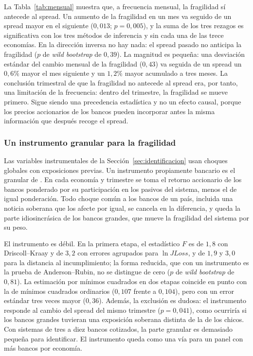La Tabla~\ref{tab:mensual} muestra que, a frecuencia mensual, la fragilidad sí antecede al spread. Un aumento de la fragilidad en un mes va seguido de un spread mayor en el siguiente ($0{,}013$; $p=0{,}005$), y la suma de los tres rezagos es significativa con los tres métodos de inferencia y sin cada una de las trece economías. En la dirección inversa no hay nada: el spread pasado no anticipa la fragilidad ($p$ de \textit{wild bootstrap} de $0{,}39$). La magnitud es pequeña: una desviación estándar del cambio mensual de la fragilidad ($0{,}43$) va seguida de un spread un $0{,}6\%$ mayor el mes siguiente y un $1{,}2\%$ mayor acumulado a tres meses. La conclusión trimestral de que la fragilidad no antecede al spread era, por tanto, una limitación de la frecuencia: dentro del trimestre, la fragilidad se mueve primero. Sigue siendo una precedencia estadística y no un efecto causal, porque los precios accionarios de los bancos pueden incorporar antes la misma información que después recoge el spread.

\subsubsection{Un instrumento granular para la fragilidad}
\label{sec:giv}

Las variables instrumentales de la Sección~\ref{sec:identificacion} usan choques globales con exposiciones previas. Un instrumento propiamente bancario es el granular de \citet{GabaixKoijen2024}. En cada economía y trimestre se toma el retorno accionario de los bancos ponderado por su participación en los pasivos del sistema, menos el de igual ponderación. Todo choque común a los bancos de un país, incluida una noticia soberana que los afecte por igual, se cancela en la diferencia, y queda la parte idiosincrásica de los bancos grandes, que mueve la fragilidad del sistema por su peso.

El instrumento es débil. En la primera etapa, el estadístico $F$ es de $1{,}8$ con Driscoll--Kraay y de $3{,}2$ con errores agrupados para $\ln JLoss$, y de $1{,}9$ y $3{,}0$ para la distancia al incumplimiento; la forma reducida, que con un instrumento es la prueba de Anderson--Rubin, no se distingue de cero ($p$ de \textit{wild bootstrap} de $0{,}81$). La estimación por mínimos cuadrados en dos etapas coincide en punto con la de mínimos cuadrados ordinarios ($0{,}107$ frente a $0{,}104$), pero con un error estándar tres veces mayor ($0{,}36$). Además, la exclusión es dudosa: el instrumento responde al cambio del spread del mismo trimestre ($p=0{,}041$), como ocurriría si los bancos grandes tuvieran una exposición soberana distinta de la de los chicos. Con sistemas de tres a diez bancos cotizados, la parte granular es demasiado pequeña para identificar. El instrumento queda como una vía para un panel con más bancos por economía.

